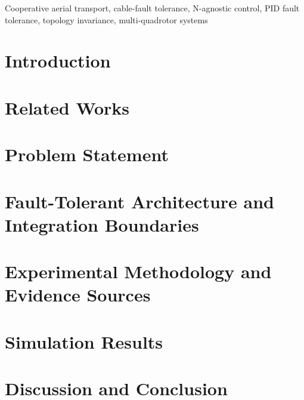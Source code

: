 \documentclass[lettersize,journal]{IEEEtran}
\begin{document}
\begin{IEEEkeywords}
    Cooperative aerial transport, cable-fault tolerance, N-agnostic control, PID fault tolerance, topology invariance, multi-quadrotor systems
\end{IEEEkeywords}

\section{Introduction}


\section{Related Works}\label{Section_II:Related_Works}


\section{Problem Statement}\label{Section_III:Problem_Statement}


\section{Fault-Tolerant Architecture and Integration Boundaries}\label{Section_IV:Fault-Tolerant_Control_Architecture}


\section{Experimental Methodology and Evidence Sources}\label{Section_V:Experimental_Methodology}


\section{Simulation Results}\label{Section_VI:Simulation_Results}


\section{Discussion and Conclusion}\label{Section_VII:Discussion}




\end{document}
